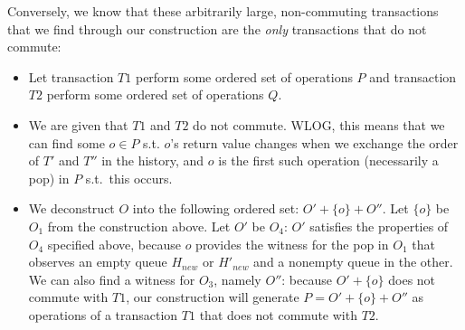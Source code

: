 Conversely, we know that these arbitrarily large, non-commuting transactions that we find through our construction are the \emph{only} transactions that do not commute: 
\begin{itemize}
    \item Let transaction $T1$ perform some ordered set of operations $P$ and transaction $T2$ perform some ordered set of operations $Q$.
    \item We are given that $T1$ and $T2$ do not commute. WLOG, this means that we can find some $o \in P$ s.t. $o$'s return value changes when we exchange the order of $T'$ and $T''$ in the history, and $o$ is the first such operation (necessarily a pop) in $P$ s.t.\ this occurs.
    \item We deconstruct $O$ into the following ordered set: $O' + \{o\} + O''$. Let $\{o\}$ be $O_1$ from the construction above. 
        Let $O'$ be $O_4$: $O'$ satisfies the properties of $O_4$ specified above, because $o$ provides the witness for the pop in $O_1$ that observes an empty queue $H_{new}$ or $H'_{new}$ and a nonempty queue in the other. We can also find a witness for $O_3$, namely $O''$: because $O' + \{o\}$ does not commute with $T1$, our construction will generate $P = O' + \{o\} + O''$ as operations of a transaction $T1$ that does not commute with $T2$.
\end{itemize}

